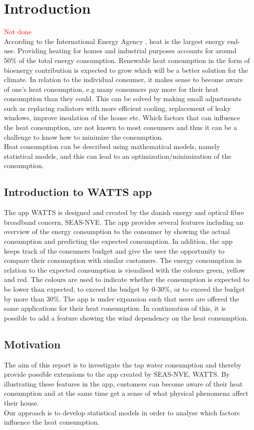 \chapter{Introduction}
\textcolor{red}{Not done} \\

\noindent According to the International Energy Agency \cite{iea}, heat is the largest energy end-use. Providing heating for homes and industrial purposes accounts for around 50\% of the total energy consumption. Renewable heat consumption in the form of bioenergy contribution is expected to grow which will be a better solution for the climate. In relation to the individual consumer, it makes sense to become aware of one's heat consumption, e.g many consumers pay more for their heat consumption than they could. This can be solved by making small adjustments such as replacing radiators with more efficient cooling, replacement of leaky windows, improve insulation of the house etc. Which factors that can influence the heat consumption, are not known to most consumers and thus it can be a challenge to know how to minimize the consumption. \\

\noindent Heat consumption can be described using mathematical models, namely statistical models, and this can lead to an optimization/minimization of the consumption.

\section{Introduction to WATTS app}
The app WATTS is designed and created by the danish energy and optical fibre broadband concern, SEAS-NVE. The app provides several features including an overview of the energy consumption to the consumer by showing the actual consumption and predicting the expected consumption. In addition, the app keeps track of the consumers budget and give the user the opportunity to compare their consumption with similar customers. The energy consumption in relation to the expected consumption is visualised with the colours green, yellow and red. The colours are used to indicate whether the consumption is expected to be lower than expected, to exceed the budget by 0-30\%, or to exceed the budget by more than 30\%.
\noindent The app is under expansion such that users are offered the same applications for their heat consumption. In continuation of this, it is possible to add a feature showing the wind dependency on the heat consumption.

\section{Motivation}
The aim of this report is to investigate the tap water consumption and thereby provide possible extensions to the app created by SEAS-NVE, WATTS. By illustrating these features in the app, customers can become aware of their heat consumption and at the same time get a sense of what physical phenomena affect their house. \\

\noindent Our approach is to develop statistical models in order to analyse which factors influence the heat consumption.
